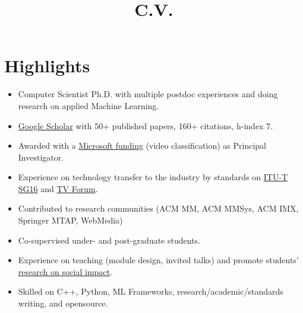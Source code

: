 \documentclass[10pt,a4paper,sans,colorlinks]{moderncv}
\title{C.V.}
\begin{document}
\setHyperrefBlueLinks
\makecvtitle
\vspace{-2em}

\section{Highlights}

\begin{itemize}
    \item Computer Scientist Ph.D. with multiple postdoc experiences and doing research on applied Machine Learning.
    \item \href{https://scholar.google.com/citations?user=1bEOmkUAAAAJ&hl=en}{Google Scholar} with 50+ published papers, 160+ citations, h-index 7.
    \item Awarded with a \href{https://www.rnp.br/en/rnp-and-microsoft-challenge-artificial-intelligence}{Microsoft funding} (video classification) as Principal Investigator.
    \item Experience on technology transfer to the industry by standards on \href{http://www.itu.int/en/ITU-T/studygroups/2022-2024/16}{ITU-T SG16} and \href{http://forumsbtvd.org.br}{TV Forum}.
    \item Contributed to research communities (ACM MM, ACM MMSys, ACM IMX, Springer MTAP, WebMedia)
    \item Co-supervised under- and post-graduate students.
    \item Experience on teaching  (module design, invited talks) and promote students' \href{https://webmedia.org.br/2022/en/lf-award/}{research on social impact}.
    \item Skilled on C++, Python, ML Frameworks, research/academic/standards writing, and opensource.
\end{itemize}


\end{document}
